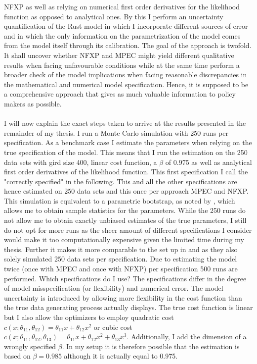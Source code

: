 NFXP as well as relying on numerical first order derivatives for the likelihood function as opposed to analytical ones. By this I perform an uncertainty quantification of the Rust model in which I incorporate different sources of error and in which the only information on the parametrization of the model comes from the model itself through its calibration. The goal of the approach is twofold. It shall uncover whether NFXP and MPEC might yield different qualitative results when facing unfavourable conditions while at the same time perform a broader check of the model implications when facing reasonable discrepancies in the mathematical and numerical model specification. Hence, it is supposed to be a comprehensive approach that gives as much valuable information to policy makers as possible. \paragraph{}

I will now explain the exact steps taken to arrive at the results presented in the remainder of my thesis. I run a Monte Carlo simulation with 250 runs per specification. As a benchmark case I estimate the parameters when relying on the true specification of the model. This means that I run the estimation on the 250 data sets with gird size 400, linear cost function, a $\beta$ of 0.975 as well as analytical first order derivatives of the likelihood function. This first specification I call the "correctly specified" in the following. This and all the other specifications are hence estimated on 250 data sets and this once per approach MPEC and NFXP. This simulation is equivalent to a parametric bootstrap, as noted by \cite{Su.Judd.2012}, which allows me to obtain sample statistics for the parameters. While the 250 runs do not allow me to obtain exactly unbiased estimates of the true parameters, I still do not opt for more runs as the sheer amount of different specifications I consider would make it too computationally expensive given the limited time during my thesis. Further it makes it more comparable to the set up in \cite{Iskhakov.2016} and \cite{Su.Judd.2012} as they also solely simulated 250 data sets per specification. Due to estimating the model twice (once with MPEC and once with NFXP) per specification 500 runs are performed. Which specifications do I use? The specifications differ in the degree of model misspecification (or flexibility) and numerical error. The model uncertainty is introduced by allowing more flexibility in the cost function than the true data generating process actually displays. The true cost function is linear but I also allow the optimizers to employ quadratic cost $c(x; \theta_{11}, \theta_{12}) = \theta_{11}x + \theta_{12}x^2$ or cubic cost $c(x; \theta_{11}, \theta_{12}, \theta_{13}) = \theta_{11}x + \theta_{12}x^2 + \theta_{13}x^3$. Additionally, I add the dimension of a wrongly specified $\beta$. In my setup it is therefore possible that the estimation is based on $\beta = 0.985$ although it is actually equal to 0.975.

